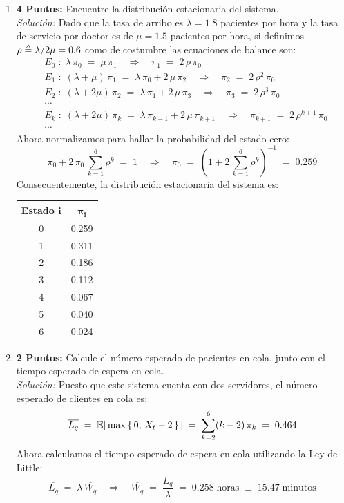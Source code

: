 \documentclass[ a4paper, twoside, 11pt]{article}
\begin{document}
\begin{problem}
\begin{enumerate}[label=\textbf{\alph*)}]
\item \textbf{4 Puntos:} Encuentre la distribuci\'on estacionaria del sistema. \\[1ex]
\emph{Soluci\'on:} Dado que la tasa de arribo es $\lambda = 1.8$ pacientes por hora y la tasa de servicio por doctor es de $\mu = 1.5$ pacientes por hora, si definimos $\rho \triangleq \lambda / 2 \mu = 0.6$ como de costumbre las ecuaciones de balance son: 
\begin{align*}
& E_0 \; \colon \; \lambda \, \pi_0 \; = \; \mu \, \pi_1
\quad \Longrightarrow \quad
\pi_1 \; = \; 2 \, \rho \, \pi_0 \\
& E_1 \; \colon \; (\lambda + \mu) \, \pi_1
\; = \; \lambda \, \pi_0 + 2 \, \mu \, \pi_2
\quad \Longrightarrow \quad
\pi_2 \; = \; 2 \, \rho^2 \, \pi_0 \\
& E_2 \; \colon \; (\lambda + 2 \mu) \, \pi_2
\; = \; \lambda \, \pi_1 + 2 \, \mu \, \pi_3
\quad \Longrightarrow \quad
\pi_3 \; = \; 2 \, \rho^3 \, \pi_0 \\
& \cdots \\
& E_k \; \colon \; (\lambda + 2\mu) \, \pi_{k} \; = \; \lambda \, \pi_{k-1} + 2 \, \mu \, \pi_{k+1} \quad \Longrightarrow \quad
\pi_{k+1} \; = \; 2 \, \rho^{k+1} \, \pi_0 \\
& \cdots
\end{align*}
Ahora normalizamos para hallar la probabilidad del estado cero: 
\[
\pi_0 + 
2 \, \pi_0 \, \sum_{k=1}^6 \rho^k \; = \; 1 \quad \Longrightarrow \quad
\pi_0 \; = \; \left( 1 + 2 \, \sum_{k=1}^6 \rho^k \right)^{-1}
\; = \; 0.259
\]
Consecuentemente, la distribuci\'on estacionaria del sistema es: 
\begin{table}[H]
\centering
\begin{tabular}{|c|c|}
\hline
\textbf{Estado} $\boldsymbol{i}$ & $\boldsymbol{\pi_i}$ \\ \hline
0 & 0.259 \\ \hline
1 & 0.311 \\ \hline
2 & 0.186 \\ \hline
3 & 0.112 \\ \hline
4 & 0.067 \\ \hline
5 & 0.040 \\ \hline
6 & 0.024 \\ \hline
\end{tabular}
\end{table}

\item \textbf{2 Puntos:} Calcule el n\'umero esperado de pacientes en cola, junto con el tiempo esperado de espera en cola. \\[1ex]
\emph{Soluci\'on:} Puesto que este sistema cuenta con dos servidores, el n\'umero esperado de clientes en cola es: 
\[
\overline{L_q} \; = \;
\mathbb{E}[ \, \max \, \{ \, 0, \, X_t-2 \, \} \, ] \; = \;
\sum_{k=2}^6 (k-2) \, \pi_k \; = \; 0.464
\]
Ahora calculamos el tiempo esperado de espera en cola utilizando la Ley de Little: 
\[
\overline{L_q} \; = \; \lambda \, \overline{W_q}
\quad \Longrightarrow \quad
\overline{W_q} \; = \; \frac{\overline{L_q}}{\lambda} \; = \; 0.258 \; \text{horas} \; \equiv \; 15.47 \; \text{minutos}
\]


\end{enumerate}
\end{problem}
\end{document}
